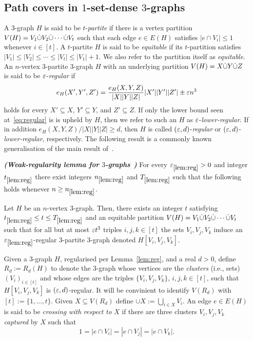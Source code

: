 \documentclass[11pt,reqno]{amsart}
\def\regref{\mathrm{\ref{lem:reg}}}
\begin{document}
\subsection{Path covers in $1$-set-dense $3$-graphs}

A $3$-graph $H$ is said to be $t$-{\em partite} if there is a vertex partition $V(H) = V_1 \dot{\cup} V_2 \dot{\cup} \cdots \dot{\cup} V_t$ such that each edge $e \in E(H)$ satisfies $|e \cap V_i| \leq 1$ whenever $i \in [t]$. A $t$-partite $H$ is said to be {\em equitable} if its $t$-partition satisfies 
$
|V_1| \leq |V_2| \leq \cdots \leq |V_t| \leq |V_1| +1
$. 
We also refer to the partition itself as {\sl equitable}. An $n$-vertex $3$-partite $3$-graph $H$ with an underlying partition $V(H) = X \dot{\cup} Y \dot{\cup} Z$ is said to be $\varepsilon$-{\em regular} if 
\begin{equation}\label{eq:regular}
e_H(X',Y',Z') = \frac{e_H(X,Y,Z)}{|X||Y||Z|}|X'||Y'||Z'| \pm \varepsilon n^3 
\end{equation} 
holds for every $X' \subseteq X$, $Y' \subseteq Y$, and $Z' \subseteq Z$. If only the lower bound seen at~\eqref{eq:regular} is is upheld by $H$, then we refer to such an $H$ as $\varepsilon$-{\em lower-regular}. If in addition $e_H(X,Y,Z) / |X||Y||Z| \geq d$, then $H$ is called $(\varepsilon,d)$-{\em regular} or $(\varepsilon,d)$-{\em lower-regular}, respectively.
The following result is a commonly known generalisation of the main result of~\cite{Szemeredi}. 

\begin{lemma}\label{lem:reg}{\em{\bf (Weak-regularity lemma for $3$-graphs}~\cite{Szemeredi}{\bf)}}
For every $\eps_{\regref} >0$ and integer $t_{\regref}$ there exist integers $n_{\regref}$ and $T_{\regref}$ such that the following holds whenever $n \geq n_{\regref}$. 

Let $H$ be an $n$-vertex $3$-graph. Then, there exists an integer $t$ satisfying $t_{\regref} \leq t \leq T_{\regref}$ and an equitable partition $V(H) = V_1 \dot{\cup} V_2 \dot{\cup} \cdots \dot{\cup} V_t$ such that 
for all but at most $\varepsilon t^3$ triples $i,j,k \in [t]$ the sets $V_i,V_j,V_k$ induce an $\eps_{\regref}$-regular $3$-partite $3$-graph denoted $H[V_i,V_j,V_k]$. 
\end{lemma}

Given a $3$-graph $H$, regularised per Lemma~\ref{lem:reg}, and a real $d >0$, define $R_d := R_d(H)$ to denote the $3$-graph whose vertices are the {\em clusters} (i.e., sets) $(V_i)_{i \in [t]}$ and whose edges are the triples $\{V_i,V_j,V_k\}$, $i,j,k \in [t]$, such that $H[V_i,V_j,V_k]$ is $(\varepsilon,d)$-regular. It will be convinient to identify $V(R_{d})$ with $[t]:=\{1,\ldots,t\}$. Given $X \subseteq V(R_d)$ define $\cup X := \bigcup_{i \in X} V_i$. An edge $e \in E(H)$ is said to be {\em crossing with respect to $X$} if there are three clusters $V_i,V_j,V_k$ {\sl captured} by $X$ such that 
$$
1 = |e\cap V_i| = |e\cap V_j|  = |e\cap V_k|.
$$ 
\end{document}
